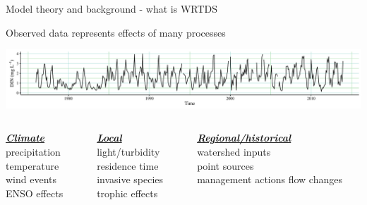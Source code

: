 \documentclass[xcolor=dvipsnames,serif]{beamer}\usepackage[]{graphicx}\usepackage[]{color}
\newcommand{\Bigtxt}[1]{\textbf{\textit{#1}}}
\begin{document}
\begin{frame}[t]{Model theory and background - what is WRTDS}{}
{\bf \centerline{Observed data represents effects of many processes}}
\vspace{0.15in}
\centerline{\includegraphics[width = \textwidth]{imgs/ts_ex.pdf}}
\vspace{0.15in}
\begin{columns}[t]
\begin{column}{0.3\textwidth}
{\bf \underline{\Bigtxt{Climate}}}\\
precipitation\\
temperature\\
wind events\\
ENSO effects
\end{column}
\begin{column}{0.3\textwidth}
{\bf \underline{\Bigtxt{Local}}}\\
light/turbidity\\
residence time\\
invasive species\\
trophic effects
\end{column}
\begin{column}{0.3\textwidth}
{\bf \underline{\Bigtxt{Regional/historical}}}\\
watershed inputs\\
point sources\\
management actions
flow changes
\end{column}
\end{columns}
\end{frame}
\end{document}

